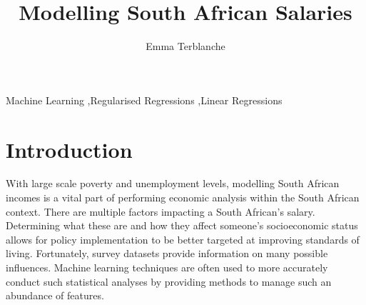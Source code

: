 \documentclass[11pt,preprint, authoryear]{elsarticle}
\numberwithin{equation}{section}
\numberwithin{figure}{section}
\numberwithin{table}{section}
\begin{document}
\begin{frontmatter}  %

\title{Modelling South African Salaries}





\author[Add1]{Emma Terblanche}





\address[Add1]{Stellenbosch University}



\vspace{1cm}


\begin{keyword}
\footnotesize{
Machine Learning \sep Regularised Regressions \sep Linear Regressions \\
\vspace{0.3cm}
}
\end{keyword}



\vspace{0.5cm}

\end{frontmatter}


\renewcommand{\contentsname}{Table of Contents}
{\tableofcontents}

\pagestyle{fancy}
\chead{}
\rhead{}
\lfoot{}
\lhead{}
\cfoot{}


\headsep 35pt %




\newpage

\hypertarget{introduction}{%
\section{Introduction}\label{introduction}}

With large scale poverty and unemployment levels, modelling South
African incomes is a vital part of performing economic analysis within
the South African context. There are multiple factors impacting a South
African's salary. Determining what these are and how they affect
someone's socioeconomic status allows for policy implementation to be
better targeted at improving standards of living. Fortunately, survey
datasets provide information on many possible influences. Machine
learning techniques are often used to more accurately conduct such
statistical analyses by providing methods to manage such an abundance of
features.
\end{document}
